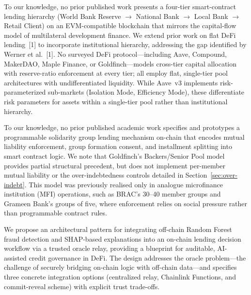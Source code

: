\documentclass[12pt,a4paper]{report}
\begin{document}
\begin{description}[leftmargin=0pt]

\item[\textbf{Contribution 1 --- Four-Tier Hierarchical DeFi Architecture.}]
To our knowledge, no prior published work presents a four-tier smart-contract lending hierarchy (World Bank Reserve $\to$ National Bank $\to$ Local Bank $\to$ Retail Client) on an EVM-compatible blockchain that mirrors the capital-flow model of multilateral development finance. We extend prior work on flat DeFi lending~[1] to incorporate institutional hierarchy, addressing the gap identified by Werner et al.~[1]. No surveyed DeFi protocol---including Aave, Compound, MakerDAO, Maple Finance, or Goldfinch---models cross-tier capital allocation with reserve-ratio enforcement at every tier; all employ flat, single-tier pool architectures with undifferentiated liquidity. While Aave~v3 implements risk-parameterized sub-markets (Isolation Mode, Efficiency Mode), these differentiate risk parameters for assets within a single-tier pool rather than institutional hierarchy.

\item[\textbf{Contribution 2 --- On-Chain Solidarity Group Lending.}]
To our knowledge, no prior published academic work specifies and prototypes a programmable solidarity group lending mechanism on-chain that encodes mutual liability enforcement, group formation consent, and installment splitting into smart contract logic. We note that Goldfinch's Backers/Senior Pool model provides partial structural precedent, but does not implement per-member mutual liability or the over-indebtedness controls detailed in Section~\ref{sec:over-indebt}. This model was previously realised only in analogue microfinance institution (MFI) operations, such as BRAC's 30--40 member groups and Grameen Bank's groups of five, where enforcement relies on social pressure rather than programmable contract rules.

\item[\textbf{Contribution 3 --- Oracle-Mediated AI/ML Integration with Explainability.}]
We propose an architectural pattern for integrating off-chain Random Forest fraud detection and SHAP-based explanations into an on-chain lending decision workflow via a trusted oracle relay, providing a blueprint for auditable, AI-assisted credit governance in DeFi. The design addresses the oracle problem---the challenge of securely bridging on-chain logic with off-chain data---and specifies three concrete integration options (centralized relay, Chainlink Functions, and commit-reveal scheme) with explicit trust trade-offs.


\end{description}
\end{document}
